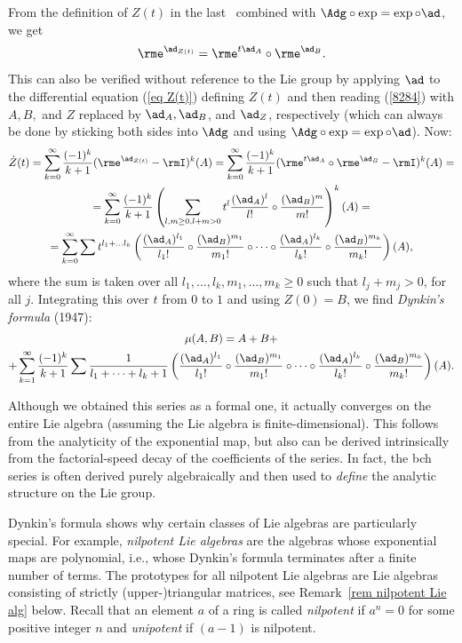 From the definition of $Z(t)$ in the last \sect\ combined with $\Adg\circ \exp=\exp\circ\ad$, we get
\[\rme^{\ad_{Z(t)}}=\rme^{t\ad_A}\circ \rme^{\ad_B}.\]
This can also be verified without reference to the Lie group by applying $\ad$ to the differential equation (\ref{eq Z(t)}) defining $Z(t)$ and then reading (\ref{8284}) with $A,B,$ and $Z$ replaced by $\ad_A,\ad_B$, and $\ad_Z$, respectively (which can always be done by sticking both sides into $\Adg$ and using $\Adg\circ\exp=\exp\circ\ad$). Now:
\begin{multline}
    \dot Z(t)=\sum_{k=0}^\infty \frac{(-1)^k}{k+1}(\rme^{\ad_{Z(t)}}-\rmI)^k(A)=\sum_{k=0}^\infty \frac{(-1)^k}{k+1}(\rme^{t\ad_A}\circ \rme^{\ad_B}-\rmI)^k(A)=\\
    =\sum_{k=0}^\infty \frac{(-1)^k}{k+1}\left(\sum_{l,m\geq 0,l+m>0}t^l\frac{(\ad_A)^l}{l!}\circ \frac{(\ad_B)^m}{m!}\right)^k (A)=\\
    =\sum_{k=0}^\infty \sum t^{l_1+\ldots l_k}
    \left(
    \frac{(\ad_A)^{l_1}}{l_1!}\circ
    \frac{(\ad_B)^{m_1}}{m_1!}\circ\cdots\circ
    \frac{(\ad_A)^{l_k}}{l_k!}\circ
    \frac{(\ad_B)^{m_k}}{m_k!}
    \right)(A),
\end{multline}
where the sum is taken over all $l_1,\ldots,l_k,m_1,\ldots,m_k\geq 0$ such that $l_j+m_j>0$, for all $j$. Integrating this over $t$ from $0$ to $1$ and using $Z(0)=B$, we find \emph{Dynkin's formula} (1947):
\begin{multline}
    \mu(A,B)=A+B+\\+\sum_{k=1}^\infty \frac{(-1)^k}{k+1}\sum \frac{1}{l_1+\cdots+l_k+1}\left(    
    \frac{(\ad_A)^{l_1}}{l_1!}\circ
    \frac{(\ad_B)^{m_1}}{m_1!}\circ\cdots\circ
    \frac{(\ad_A)^{l_k}}{l_k!}\circ
    \frac{(\ad_B)^{m_k}}{m_k!}\right)(A).
\end{multline}

\begin{rem}
    Although we obtained this series as a formal one, it actually converges on the entire Lie algebra (assuming the Lie algebra is finite-dimensional). This follows from the analyticity of the exponential map, but also can be derived intrinsically from the factorial-speed decay of the coefficients of the series. In fact, the \gls{bch} series is often derived purely algebraically and then used to \emph{define} the analytic structure on the Lie group.
\end{rem}

Dynkin's formula shows why certain classes of Lie algebras are particularly special. For example, \emph{nilpotent Lie algebras} are the algebras whose exponential maps are polynomial, i.e., whose Dynkin's formula terminates after a finite number of terms. The prototypes for all nilpotent Lie algebras are Lie algebras consisting of strictly (upper-)triangular matrices, see Remark~\ref{rem nilpotent Lie alg} below. Recall that an element $a$ of a ring is called \emph{nilpotent} if $a^n=0$ for some positive integer $n$ and \emph{unipotent} if $(a-1)$ is nilpotent.

